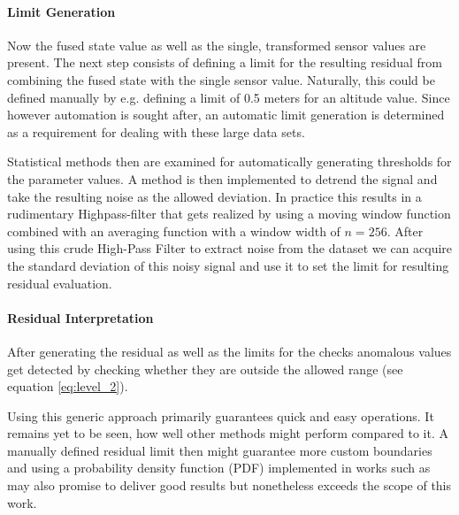 \paragraph{Limit Generation}
Now the fused state value as well as the single, transformed sensor values are present. The next step consists of defining a limit for the resulting residual from combining the fused state with the single sensor value. Naturally, this could be defined manually by e.g. defining a limit of 0.5 meters for an altitude value. Since however automation is sought after, an automatic limit generation is determined as a requirement for dealing with these large data sets.

Statistical methods then are examined for automatically generating thresholds for the parameter values. A method is then implemented to detrend the signal and take the resulting noise as the allowed deviation. In practice this results in a rudimentary Highpass-filter that gets realized by using a moving window function combined with an averaging function with a window width of $n=256$. After using this crude High-Pass Filter to extract noise from the dataset we can acquire the standard deviation of this noisy signal and use it to set the limit for resulting residual evaluation.


\paragraph{Residual Interpretation}

After generating the residual as well as the limits for the checks anomalous values get detected by checking whether they are outside the allowed range (see equation \ref{eq:level_2}).

Using this generic approach primarily guarantees quick and easy operations. It remains yet to be seen, how well other methods might perform compared to it. A manually defined residual limit then might guarantee more custom boundaries and using a probability density function (PDF) implemented in works such as \cite{svard_data-driven_2014} may also promise to deliver good results but nonetheless exceeds the scope of this work.



